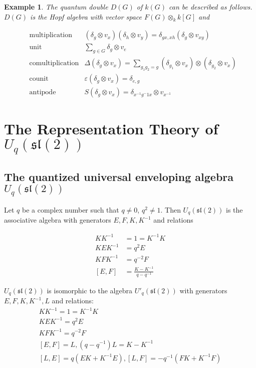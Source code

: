 \documentclass[]{article}
\newtheorem{example}[theorem]{Example}
\newcommand{\sll}{\mathfrak{sl}}
\numberwithin{equation}{subsection}
\begin{document}
\begin{example}
    The quantum double $D(G)$ of $k(G)$ can be described as follows. $D(G)$ is the Hopf algebra with vector space $F(G) \otimes_k k[G]$ and 

    \begin{align}
        &\text{multiplication} &(\delta_g\otimes v_x) (\delta_h \otimes v_y) = \delta_{gx,xh} (\delta_g \otimes v_{xy})\\
        &\text{unit}           &\sum_{g \in G} \delta_g  \otimes v_e\\
        &\text{comultiplication} &\Delta(\delta_g \otimes v_x) = \sum_{g_1 g_2 = g} (\delta_{g_1} \otimes v_x) \otimes (\delta_{g_2} \otimes v_x) \\
        &\text{counit}           &\varepsilon(\delta_g \otimes v_x) = \delta_{e,g} \\
        &\text{antipode}         &S(\delta_g \otimes v_x) = \delta_{x^{-1}g^-1 x} \otimes v_{x^{-1}}
    \end{align}


\end{example}


\section{The Representation Theory of $U_q(\sll(2))$}
\subsection{The quantized universal enveloping algebra $U_q(\sll(2))$}
Let $q$ be a complex number such that $q \neq 0$, $q^2 \neq 1$.  Then $U_q(\sll(2))$ is the associative algebra with generators $E,F,K, K^{-1}$ and relations 

\begin{align}
    KK^{-1} &= 1 = K^{-1}K \\
    KEK^{-1} &= q^2 E \\
    KFK^{-1} &= q^{-2} F \\
    [E,F] &= \frac{K - K^{-1}}{q - q^{-1}}
\end{align}


$U_q(\sll(2))$ is isomorphic to the algebra $U'_q(\sll(2))$ with generators $E,F,K,K^{-1},L$ and relations:
\begin{equation}
    \begin{gathered}
    KK^{-1} = 1 = K^{-1}K \\
    KEK^{-1} = q^2 E \\
    KFK^{-1} = q^{-2} F \\
    [E,F] = L, (q - q^{-1})L = K-K^{-1} \\
    [L,E] = q(EK + K^{-1}E), [L,F] = -q^{-1}(FK + K^{-1}F) \\
    \end{gathered}
\end{equation}
\end{document}
